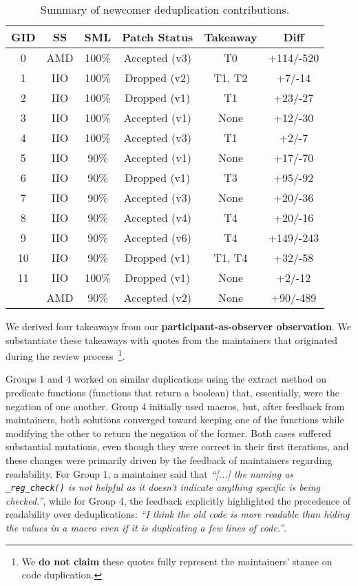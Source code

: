\documentclass[10pt,conference]{IEEEtran}
\begin{document}
\begin{table}[ht]
\centering
\caption{Summary of newcomer deduplication contributions.}
\begin{tabular}{ |c |c |c |c |c | c| }
\hline
\textbf{GID} & \textbf{SS} & \textbf{SML} & \textbf{Patch Status} & \textbf{Takeaway} & \textbf{Diff} \\
\hline
0 & AMD & 100\% & Accepted (v3) & T0 & +114/-520 \\ \hline
1 & IIO & 100\% & Dropped (v2) & T1, T2 & +7/-14 \\ \hline
2 & IIO & 100\% & Dropped (v1) & T1 & +23/-27 \\ \hline
3 & IIO & 100\% & Accepted (v1) & None & +12/-30 \\ \hline
4 & IIO & 100\% & Accepted (v3) & T1 & +2/-7 \\ \hline
5 & IIO & 90\% & Accepted (v1) & None & +17/-70 \\ \hline
6 & IIO & 90\% & Dropped (v1) & T3 & +95/-92 \\ \hline
7 & IIO & 90\% & Accepted (v3) & None & +20/-36 \\ \hline
8 & IIO & 90\% & Accepted (v4) & T4 & +20/-16 \\ \hline
9 & IIO & 90\% & Accepted (v6) & T4 & +149/-243 \\ \hline
10 & IIO & 90\% & Dropped (v1) & T1, T4 & +32/-58 \\ \hline
11 & IIO & 100\% & Dropped (v1) & None & +2/-12 \\
   & AMD & 90\% & Accepted (v2) & None & +90/-489 \\ \hline

\end{tabular}%

\label{tab:stu}
\end{table}

We derived four takeaways from our \textbf{participant-as-observer observation}. We substantiate these takeaways with quotes from the maintainers that originated during the review process~\footnote{We \textbf{do not claim} these quotes fully represent the maintainers’ stance on code duplication.}.

Groups 1 and 4 worked on similar duplications using the extract method on predicate functions (functions that return a boolean) that, essentially, were the negation of one another. Group 4 initially used macros, but, after feedback from maintainers, both solutions converged toward keeping one of the functions while modifying the other to return the negation of the former. Both cases suffered substantial mutations, even though they were correct in their first iterations, and these changes were primarily driven by the feedback of maintainers regarding readability. For Group 1, a maintainer said that \textit{``[...] the naming as \texttt{\_reg\_check()} is not helpful as it doesn't indicate anything specific is being checked.''}, while for Group 4, the feedback explicitly highlighted the precedence of readability over deduplications: \textit{``I think the old code is more readable than hiding the values in a macro even if it is duplicating a few lines of code.''}.
\end{document}
